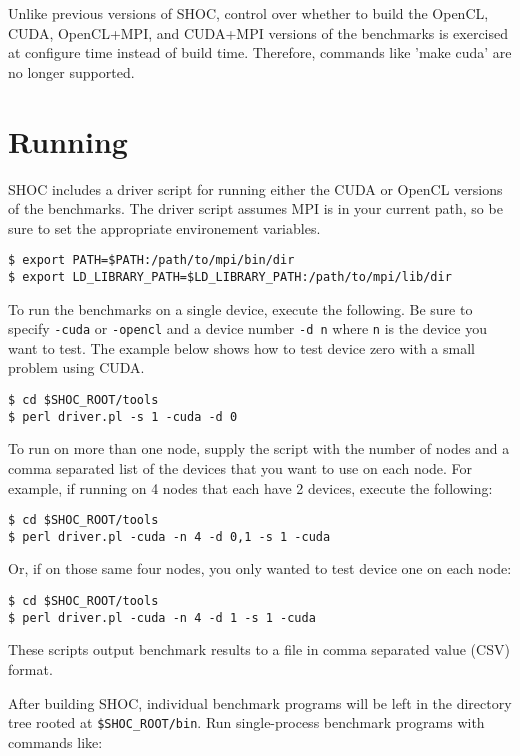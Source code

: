 \documentclass[11pt]{article}
\begin{document}
Unlike previous versions of SHOC, control over whether to build the 
OpenCL, CUDA, OpenCL+MPI, and CUDA+MPI versions of the benchmarks is
exercised at configure time instead of build time.
Therefore, commands like 'make cuda' are no longer supported.


\section{Running}\label{sec:running}

SHOC includes a driver script for running either the CUDA or OpenCL versions
of the benchmarks. The driver script assumes MPI is in your current path,
so be sure to set the appropriate environement variables.

\begin{Verbatim}[frame=single]
$ export PATH=$PATH:/path/to/mpi/bin/dir
$ export LD_LIBRARY_PATH=$LD_LIBRARY_PATH:/path/to/mpi/lib/dir
\end{Verbatim}

To run the benchmarks on a single device, execute the following. Be sure
to specify \verb+-cuda+ or \verb+-opencl+ and a device number \verb+-d n+
where \verb+n+ is the device you want to test. The example below shows how
to test device zero with a small problem using CUDA.

\begin{Verbatim}[frame=single]
$ cd $SHOC_ROOT/tools
$ perl driver.pl -s 1 -cuda -d 0
\end{Verbatim}

To run on more than one node, supply the script with the number of nodes and 
a comma separated list of the devices that you want to use on each node. For
example, if running on 4 nodes that each have 2 devices, execute the following: 

\begin{Verbatim}[frame=single]
$ cd $SHOC_ROOT/tools
$ perl driver.pl -cuda -n 4 -d 0,1 -s 1 -cuda
\end{Verbatim}

Or, if on those same four nodes, you only wanted to test device one on each node:

\begin{Verbatim}[frame=single]
$ cd $SHOC_ROOT/tools
$ perl driver.pl -cuda -n 4 -d 1 -s 1 -cuda
\end{Verbatim}

These scripts output benchmark results to a file in comma separated value (CSV) format.

After building SHOC, individual benchmark programs will be left in the
directory tree rooted at \verb+$SHOC_ROOT/bin+.
Run single-process benchmark programs with commands like:
\end{document}
